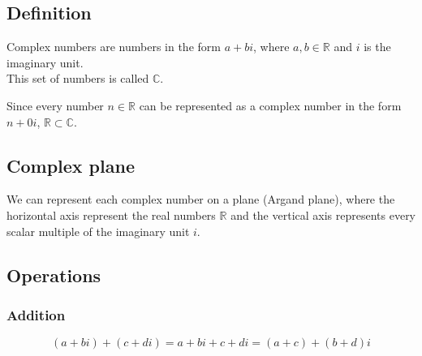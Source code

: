 \documentclass[a4paper]{article}
\begin{document}
\subsection{Definition}

Complex numbers are numbers in the form \(a + bi\),
where \(a,b\in\mathbb{R}\) and \(i\) is the imaginary unit.
\\
This set of numbers is called \(\mathbb{C}\).

Since every number \(n\in\mathbb{R}\) can be represented as
a complex number in the form \(n+0i\), \(\mathbb{R}\subset\mathbb{C}\).

\subsection{Complex plane}

We can represent each complex number on a plane (Argand plane), where the horizontal axis
represent the real numbers \(\mathbb{R}\) and the vertical axis represents
every scalar multiple of the imaginary unit \(i\).

\begin{center}
\end{center}

\subsection{Operations}

\subsubsection{Addition}
\[
    (a+bi)+(c+di)=a+bi+c+di=(a+c)+(b+d)i
\]
\end{document}

